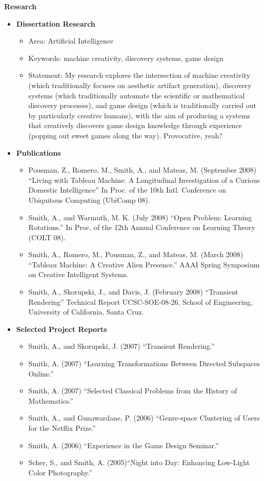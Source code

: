 \documentclass[10pt]{article}
\begin{document}
{\large \textbf{Research}}
\begin{itemize}

\item
    \textbf{Dissertation Research}
    \begin{itemize}
        \item Area: Artificial Intelligence
        \item Keywords: machine creativity, discovery systems, game design
        \item Statement: My research explores the intersection of machine creativity (which traditionally focuses on aesthetic artifact generation), discovery systems (which traditionally automate the scientific or mathematical discovery processes), and game design (which is traditionally carried out by particularly creative humans), with the aim of producing a systems that creatively discovers game design knowledge through experience (popping out sweet games along the way). Provocative, yeah?
    \end{itemize}
 
\item 
    \textbf{Publications}
    \begin{itemize}
        \item Pousman, Z., Romero, M., Smith, A., and Mateas, M. (September 2008) ``Living with Tableau Machine: A Longitudinal Investigation of a Curious Domestic Intelligence'' In Proc. of the 10th Intl. Conference on Ubiquitous Computing (UbiComp 08).
        \item Smith, A., and Warmuth, M. K. (July 2008) ``Open Problem: Learning Rotations.'' In Proc. of the 12th Annual Conference on Learning Theory (COLT 08).
        \item Smith, A., Romero, M., Pousman, Z., and Mateas, M. (March 2008) ``Tableau Machine: A Creative Alien Presence.'' AAAI Spring Symposium on Creative Intelligent Systems. 
        \item Smith, A., Skorupski, J., and Davis, J. (February 2008) ``Transient Rendering'' Technical Report UCSC-SOE-08-26, School of Engineering, University of California, Santa Cruz.
  \end{itemize}
  
\item  
  \textbf{Selected Project Reports}
    \begin{itemize}
       \item Smith, A., and Skorupski, J. (2007) ``Transient Rendering.''
       \item Smith, A. (2007) ``Learning Transformations Between Directed Subspaces Online.''
       \item Smith, A. (2007) ``Selected Classical Problems from the History of Mathematics.''
       \item Smith, A., and Gunawardane, P. (2006) ``Genre-space Clustering of Users for the Netflix Prize.''
       \item Smith, A. (2006) ``Experience in the Game Design Seminar.''
       \item Scher, S., and Smith, A. (2005)``Night into Day: Enhancing Low-Light Color Photography.''
  \end{itemize}
    

\end{itemize}
\end{document}
